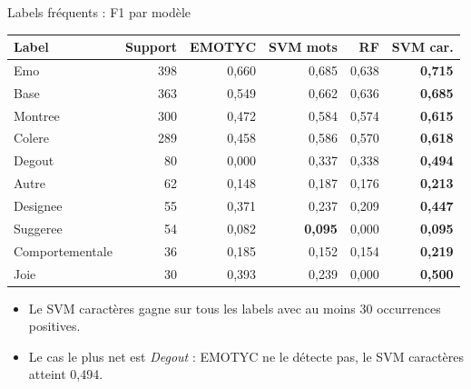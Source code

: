 \documentclass[aspectratio=169]{beamer}
\newcommand{\best}[1]{\textbf{\color{accent}#1}}
\begin{document}
\begin{frame}{Labels fréquents : F1 par modèle}
  \begin{center}
  \scriptsize
  \setlength{\tabcolsep}{5pt}
  \renewcommand{\arraystretch}{0.84}
  \begin{tabular}{lrrrrr}
    \toprule
    \textbf{Label} & \textbf{Support} & \textbf{EMOTYC} & \textbf{SVM mots} & \textbf{RF} & \textbf{SVM car.} \\
    \midrule
    Emo & 398 & 0,660 & 0,685 & 0,638 & \best{0,715} \\
    Base & 363 & 0,549 & 0,662 & 0,636 & \best{0,685} \\
    Montree & 300 & 0,472 & 0,584 & 0,574 & \best{0,615} \\
    Colere & 289 & 0,458 & 0,586 & 0,570 & \best{0,618} \\
    Degout & 80 & 0,000 & 0,337 & 0,338 & \best{0,494} \\
    Autre & 62 & 0,148 & 0,187 & 0,176 & \best{0,213} \\
    Designee & 55 & 0,371 & 0,237 & 0,209 & \best{0,447} \\
    Suggeree & 54 & 0,082 & \best{0,095} & 0,000 & \best{0,095} \\
    Comportementale & 36 & 0,185 & 0,152 & 0,154 & \best{0,219} \\
    Joie & 30 & 0,393 & 0,239 & 0,000 & \best{0,500} \\
    \bottomrule
  \end{tabular}
  \end{center}

  \vspace{-0.1cm}
  \begin{itemize}\footnotesize
    \item Le SVM caractères gagne sur tous les labels avec au moins 30 occurrences positives.
    \item Le cas le plus net est \textit{Degout} : EMOTYC ne le détecte pas, le SVM caractères atteint 0,494.
  \end{itemize}
\end{frame}
\end{document}
